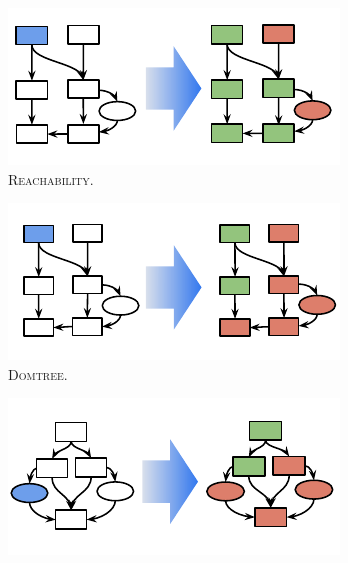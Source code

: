 \begin{figure}
  \centering
  \begin{subfigure}{.19\linewidth}
    \includegraphics[width=\linewidth]{images/dataflow/A_reachability}%
    \caption{\textsc{Reachability}.}
    \label{subfig:dataflow_reachability}
  \end{subfigure}
  \hfill
  \begin{subfigure}{.19\linewidth}
    \includegraphics[width=\linewidth]{images/dataflow/B_domtree}%
    \caption{\textsc{Domtree}.}
    \label{subfig:dataflow_domtree}
  \end{subfigure}
  \hfill
  \begin{subfigure}{.19\linewidth}
    \includegraphics[width=\linewidth]{images/dataflow/C_datadep}%

\end{subfigure}
\end{figure}

